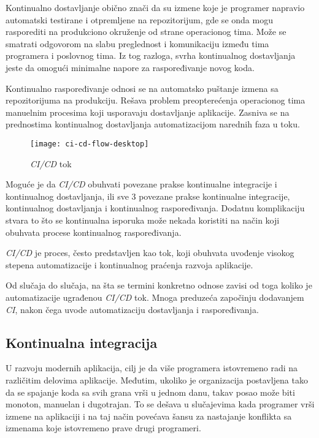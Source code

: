 Kontinualno dostavljanje obično znači da su izmene koje je programer napravio automatski testirane 
i otpremljene na repozitorijum, gde se onda mogu rasporediti na produkciono okruženje od strane 
operacionog tima. Može se smatrati odgovorom na slabu preglednost i komunikaciju između tima 
programera i poslovnog tima. Iz tog razloga, svrha kontinualnog dostavljanja jeste da omogući 
minimalne napore za raspoređivanje novog koda.

Kontinualno raspoređivanje odnosi se na automatsko puštanje izmena sa repozitorijuma na produkciju. 
Rešava problem preopterećenja operacionog tima manuelnim procesima koji usporavaju dostavljanje 
aplikacije. Zasniva se na prednostima kontinualnog dostavljanja automatizacijom narednih faza u toku.

\begin{figure}[h]
    \centering
    \texttt{[image: ci-cd-flow-desktop]}
    \caption{\textit{CI/CD} tok}
\end{figure}

Moguće je da \textit{CI/CD} obuhvati povezane prakse kontinualne integracije i kontinualnog dostavljanja, 
ili sve 3 povezane prakse kontinualne integracije, kontinualnog dostavljanja i kontinualnog 
raspoređivanja. Dodatnu komplikaciju stvara to što se kontinualna isporuka može nekada koristiti 
na način koji obuhvata procese kontinualnog raspoređivanja.

\textit{CI/CD} je proces, često predstavljen kao tok, koji obuhvata uvođenje visokog stepena 
automatizacije i kontinualnog praćenja razvoja aplikacije.

Od slučaja do slučaja, na šta se termini konkretno odnose zavisi od toga koliko je automatizacije 
ugrađenou \textit{CI/CD} tok. Mnoga preduzeća započinju dodavanjem \textit{CI}, nakon čega uvode automatizaciju 
dostavljanja i raspoređivanja.

\subsection{Kontinualna integracija}
U razvoju modernih aplikacija, cilj je da više programera istovremeno radi na različitim delovima 
aplikacije. Međutim, ukoliko je organizacija postavljena tako da se spajanje koda sa svih grana 
vrši u jednom danu, takav posao može biti monoton, manuelan i dugotrajan. To se dešava u slučajevima 
kada programer vrši izmene na aplikaciji i na taj način povećava šansu za nastajanje konflikta sa 
izmenama koje istovremeno prave drugi programeri.

